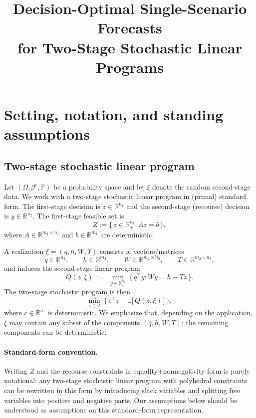 \documentclass[11pt]{article}
\title{Decision-Optimal Single-Scenario Forecasts\\for Two-Stage Stochastic Linear Programs}
\author{}
\date{}
\theoremstyle{plain}
\theoremstyle{definition}
\theoremstyle{remark}
\newcommand{\R}{\mathbb{R}}
\newcommand{\E}{\mathbb{E}}
\begin{document}
\maketitle

\tableofcontents

\section{Setting, notation, and standing assumptions}\label{sec:setting}

\subsection{Two-stage stochastic linear program}\label{subsec:2stage}

Let $(\Omega,\mathcal F,\mathbb P)$ be a probability space and let $\xi$ denote the random second-stage
data.  We work with a two-stage stochastic linear program in (primal) standard form.
The first-stage decision is $z\in\R^{n_1}$ and the second-stage (recourse) decision is $y\in\R^{n_2}$.
The first-stage feasible set is
\begin{equation}\label{eq:Z-def}
  Z := \{\, z\in\R^{n_1}_+ : Az=b \,\},
\end{equation}
where $A\in\R^{m_1\times n_1}$ and $b\in\R^{m_1}$ are deterministic.

A realization $\xi=(q,h,W,T)$ consists of vectors/matrices
\[
q\in\R^{n_2},\qquad h\in\R^{m_2},\qquad W\in\R^{m_2\times n_2},\qquad T\in\R^{m_2\times n_1},
\]
and induces the second-stage linear program
\begin{equation}\label{eq:recourse-LP}
  Q(z,\xi)\;:=\;\min_{y\in\R^{n_2}_+}\ \{\, q^\top y : Wy = h - Tz \,\}.
\end{equation}
The two-stage stochastic program is then
\begin{equation}\label{eq:2stage-SP}
  \min_{z\in Z}\ \Big\{\, c^\top z + \E\big[\, Q(z,\xi)\,\big] \,\Big\},
\end{equation}
where $c\in\R^{n_1}$ is deterministic.  We emphasize that, depending on the application, $\xi$ may contain
any subset of the components $(q,h,W,T)$; the remaining components can be deterministic.

\paragraph{Standard-form convention.}
Writing $Z$ and the recourse constraints in equality$+$nonnegativity form is purely notational: any two-stage
stochastic linear program with polyhedral constraints can be rewritten in this form by introducing slack
variables and splitting free variables into positive and negative parts.  Our assumptions below should be
understood as assumptions on this standard-form representation.
\end{document}
